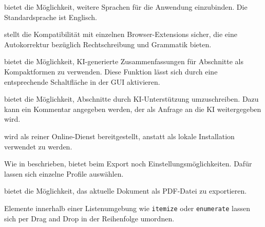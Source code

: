 \clearpage


\texla{} bietet die Möglichkeit, weitere Sprachen für die Anwendung einzubinden.
Die Standardsprache ist Englisch.


\texla{} stellt die Kompatibilität mit einzelnen Browser-Extensions sicher, die eine Autokorrektur bezüglich
Rechtschreibung und Grammatik bieten.


\texla{} bietet die Möglichkeit, KI-generierte Zusammenfassungen für Abschnitte als Kompaktformen zu verwenden.
Diese Funktion lässt sich durch eine entsprechende Schaltfläche in der GUI aktivieren.


\texla{} bietet die Möglichkeit, Abschnitte durch KI-Unterstützung umzuschreiben.
Dazu kann ein Kommentar angegeben werden, der als Anfrage an die KI weitergegeben wird.


\texla{} wird als reiner Online-Dienst bereitgestellt, anstatt als lokale Installation verwendet zu werden.


Wie in  beschrieben, bietet \texla{} beim Export noch Einstellungsmöglichkeiten.
Dafür lassen sich einzelne Profile auswählen.


\texla{} bietet die Möglichkeit, das aktuelle Dokument als PDF-Datei zu exportieren.

\clearpage


Elemente innerhalb einer Listenumgebung wie \verb|itemize| oder \verb|enumerate| lassen sich per Drag and Drop in der
Reihenfolge umordnen.
